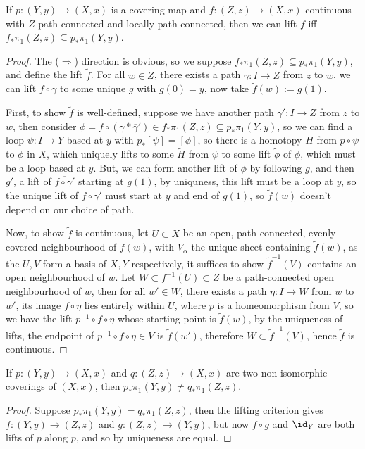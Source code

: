 \documentclass{article}
\begin{document}
\begin{theorem}
    If $p:(Y,y)\rightarrow (X,x)$ is a covering map and $f:(Z,z)\rightarrow (X,x)$ continuous with $Z$ path-connected and locally path-connected, then we can lift $f$ iff $f_*\pi_1(Z,z)\subseteq p_*\pi_1(Y,y)$.
    \begin{proof}
        The ($\Rightarrow$) direction is obvious, so we suppose $f_*\pi_1(Z,z)\subseteq p_*\pi_1(Y,y)$, and define the lift $\tilde{f}$. For all $w\in Z$, there exists a path $\gamma:I\rightarrow Z$ from $z$ to $w$, we can lift $f\circ \gamma$ to some unique $g$ with $g(0) = y$, now take $\tilde{f}(w):= g(1)$.

        First, to show $\tilde{f}$ is well-defined, suppose we have another path $\gamma':I\rightarrow Z$ from $z$ to $w$, then consider $\phi = f\circ(\gamma * \overline{\gamma}')\in f_*\pi_1(Z,z)\subseteq p_*\pi_1(Y,y)$, so we can find a loop $\psi:I\rightarrow Y$ based at $y$ with $p_*[\psi] = [\phi]$, so there is a homotopy $H$ from $p\circ\psi$ to $\phi$ in $X$, which uniquely lifts to some $\tilde{H}$ from $\psi$ to some lift $\tilde{\phi}$ of $\phi$, which must be a loop based at $y$. But, we can form another lift of $\phi$ by following $g$, and then $g'$, a lift of $\overline{f\circ\gamma'}$ starting at $g(1)$, by uniquness, this lift must be a loop at $y$, so the unique lift of $f\circ\gamma'$ must start at $y$ and end of $g(1)$, so $\tilde{f}(w)$ doesn't depend on our choice of path.

        Now, to show $\tilde{f}$ is continuous, let $U\subset X$ be an open, path-connected, evenly covered neighbourhood of $f(w)$, with $V_\alpha$ the unique sheet containing $\tilde{f}(w)$, as the $U,V$ form a basis of $X,Y$ respectively, it suffices to show $\tilde{f}^{-1}(V)$ contains an open neighbourhood of $w$. Let $W\subset f^{-1}(U)\subset Z$ be a path-connected open neighbourhood of $w$, then for all $w'\in W$, there exists a path $\eta:I\rightarrow W$ from $w$ to $w'$, its image $f\circ\eta$ lies entirely within $U$, where $p$ is a homeomorphism from $V$, so we have the lift $p^{-1}\circ f \circ \eta$ whose starting point is $\tilde{f}(w)$, by the uniqueness of lifts, the endpoint of $p^{-1}\circ f \circ \eta \in V$ is $\tilde{f}(w')$, therefore $W\subset \tilde{f}^{-1}(V)$, hence $\tilde{f}$ is continuous.
    \end{proof}
\end{theorem}

\begin{corollary}
    If $p:(Y,y)\rightarrow (X,x)$ and  $q:(Z,z)\rightarrow (X,x)$ are two non-isomorphic coverings of $(X,x)$, then $p_*\pi_1(Y,y)\neq q_*\pi_1(Z,z)$.\begin{proof}
        Suppose $p_*\pi_1(Y,y)=q_*\pi_1(Z,z)$, then the lifting criterion gives $f:(Y,y)\rightarrow (Z,z)$ and $g:(Z,z)\rightarrow (Y,y)$, but now $f\circ g$ and $\id_Y$ are both lifts of $p$ along $p$, and so by uniqueness are equal.
    \end{proof}
\end{corollary}
\end{document}
